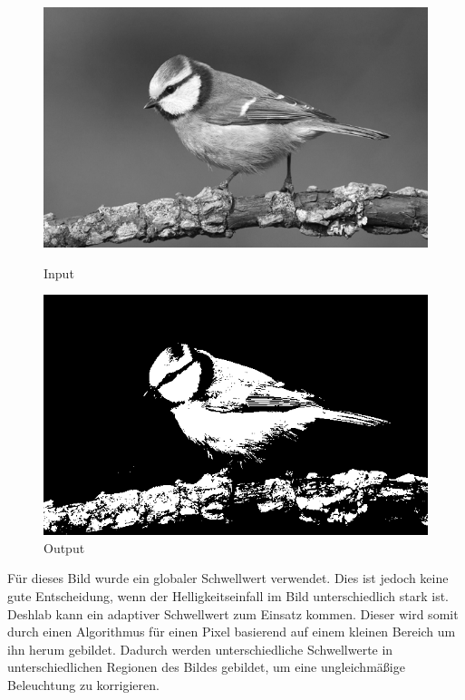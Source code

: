 \begin{figure}[htb]
    \centering
    \begin{minipage}[t]{0.45\linewidth}
        \centering
        \includegraphics[width=\linewidth]{pics/bildverarbeitungsalgos/grayscaling_output.png}
        \caption{Input}
        \label{maai:thresholding:input:second}
    \end{minipage}
    \hfill
    \begin{minipage}[t]{0.45\linewidth}
        \centering
        \includegraphics[width=\linewidth]{pics/bildverarbeitungsalgos/thresholding_output.png}
        \caption{Output}
        \label{maai:thresholding:output}
    \end{minipage}
\end{figure}


Für dieses Bild wurde ein globaler Schwellwert verwendet. Dies ist jedoch keine gute Entscheidung, wenn der Helligkeitseinfall im Bild unterschiedlich stark ist. Deshlab kann ein adaptiver Schwellwert zum Einsatz kommen. Dieser wird somit durch einen Algorithmus für einen Pixel basierend auf einem kleinen Bereich um ihn herum gebildet. Dadurch werden unterschiedliche Schwellwerte in unterschiedlichen Regionen des Bildes gebildet, um eine ungleichmäßige Beleuchtung zu korrigieren.

